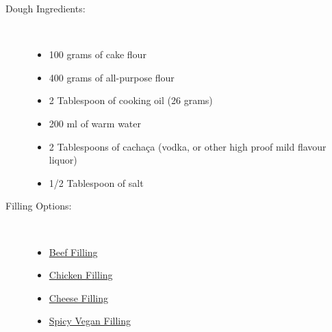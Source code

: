 \documentclass[11pt,letterpaper]{article}
\begin{document}
\vspace{0.3in}

\begin{description}

\item[Dough Ingredients:]\ \\
	\begin{itemize}
	\item 100 grams of cake flour
	\item 400 grams of all-purpose flour
	\item 2 Tablespoon of cooking oil (26 grams)
	\item 200 ml of warm water
	\item 2 Tablespoons of cacha\c{c}a (vodka, or other high proof mild flavour liquor)
	\item 1/2 Tablespoon of salt
	\end{itemize}

\item[Filling Options:]\ \\
	\begin{itemize}
	\item \href{BeefFilling.html}{Beef Filling}
	\item  \href{ChickenFilling.html}{Chicken Filling}
	\item \href{CheeseFilling.html}{Cheese Filling}
	\item \href{VeganFilling.html}{Spicy Vegan Filling}
	\end{itemize}
	

\end{description}
\end{document}
